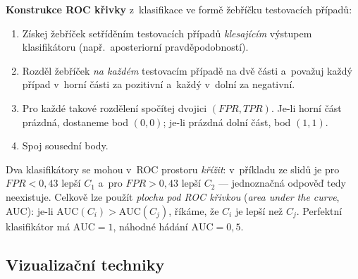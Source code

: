 \documentclass[11pt,a4paper]{article}
\theoremstyle{definition}
\begin{document}
\textbf{Konstrukce ROC křivky} z~klasifikace ve formě žebříčku testovacích případů:
\begin{enumerate}
\item Získej žebříček setříděním testovacích případů \emph{klesajícím} výstupem klasifikátoru
      (např.\ aposteriorní pravděpodobností).
\item Rozděl žebříček \emph{na každém} testovacím případě na dvě části a~považuj každý případ
      v~horní části za pozitivní a~každý v~dolní za negativní.
\item Pro každé takové rozdělení spočítej dvojici $(\mathit{FPR},\mathit{TPR})$. Je-li horní
      část prázdná, dostaneme bod $(0,0)$; je-li prázdná dolní část, bod $(1,1)$.
\item Spoj sousední body.
\end{enumerate}

\begin{defbox}
Dva klasifikátory se mohou v~ROC prostoru \emph{křížit}: v~příkladu ze slidů je pro
$\mathit{FPR}<0{,}43$ lepší $C_1$ a~pro $\mathit{FPR}>0{,}43$ lepší $C_2$ --- jednoznačná
odpověď  tedy neexistuje. Celkově lze použít \emph{plochu pod ROC křivkou}
(\emph{area under the curve}, AUC): je-li $\mathrm{AUC}(C_i)>\mathrm{AUC}(C_j)$, říkáme, že
$C_i$ je lepší než $C_j$. Perfektní klasifikátor má $\mathrm{AUC}=1$, náhodné hádání
$\mathrm{AUC}=0{,}5$.
\end{defbox}

\subsection{Vizualizační techniky}
\end{document}
